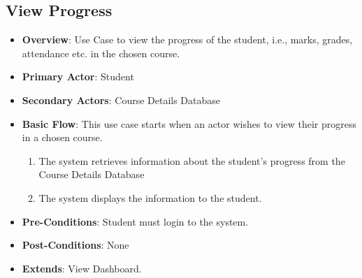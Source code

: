\documentclass[12pt, a4]{article}
\begin{document}

\subsection{View Progress}
\begin{itemize}
    \item \textbf{Overview}: Use Case to view the progress of the student, i.e., marks, grades, attendance etc. in the chosen course.
    \item \textbf{Primary Actor}: Student
    \item \textbf{Secondary Actors}: Course Details Database
    \item \textbf{Basic Flow}: This use case starts when an actor wishes to view their progress in a chosen course.
        \begin{enumerate}
            \item The system retrieves information about the student's progress from the Course Details Database
            \item The system displays the information to the student.
        \end{enumerate}
    \item \textbf{Pre-Conditions}: Student must login to the system.
    \item \textbf{Post-Conditions}: None
    \item \textbf{Extends}: View Dashboard.
\end{itemize}


\end{document}
